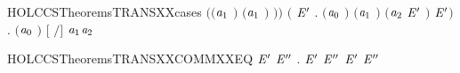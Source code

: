 \begin{SaveVerbatim}{HOLCCSTheoremsTRANSXXcases}
            \ensuremath{(}\ensuremath{(}\ensuremath{\HOLBoundVar{a}\sb{\mathrm{1}}} \HOLSymConst{\ensuremath{=}} \HOLConst{\ensuremath{\tau}}\ensuremath{)} \HOLSymConst{\HOLTokenDisj{}} \ensuremath{(}\ensuremath{\HOLBoundVar{a}\sb{\mathrm{1}}} \HOLSymConst{\ensuremath{=}}  \ensuremath{)} \HOLSymConst{\HOLTokenConj{}}  \HOLConst{\HOLTokenNotIn{}}  \HOLSymConst{\HOLTokenConj{}}   \HOLConst{\HOLTokenNotIn{}} \ensuremath{)}\ensuremath{)} \HOLSymConst{\HOLTokenDisj{}}
       \ensuremath{(}\HOLSymConst{\HOLTokenExists{}}  \ensuremath{\HOLBoundVar{E}\sp{\prime}} .
            \ensuremath{(}\ensuremath{\HOLBoundVar{a}\sb{\mathrm{0}}} \HOLSymConst{\ensuremath{=}}   \ensuremath{)} \HOLSymConst{\HOLTokenConj{}} \ensuremath{(}\ensuremath{\HOLBoundVar{a}\sb{\mathrm{1}}} \HOLSymConst{\ensuremath{=}}   \ensuremath{)} \HOLSymConst{\HOLTokenConj{}}
            \ensuremath{(}\ensuremath{\HOLBoundVar{a}\sb{\mathrm{2}}} \HOLSymConst{\ensuremath{=}}  \ensuremath{\HOLBoundVar{E}\sp{\prime}} \ensuremath{)} \HOLSymConst{\HOLTokenConj{}}  \HOLTokenTransBegin{}\HOLTokenTransEnd \ensuremath{\HOLBoundVar{E}\sp{\prime}}\ensuremath{)} \HOLSymConst{\HOLTokenDisj{}}
       \HOLSymConst{\HOLTokenExists{}} . \ensuremath{(}\ensuremath{\HOLBoundVar{a}\sb{\mathrm{0}}} \HOLSymConst{\ensuremath{=}}   \ensuremath{)} \HOLSymConst{\HOLTokenConj{}} \ensuremath{[}  \ensuremath{/}\ensuremath{]}  \HOLTokenTransBegin\ensuremath{\HOLBoundVar{a}\sb{\mathrm{1}}}\HOLTokenTransEnd \ensuremath{\HOLBoundVar{a}\sb{\mathrm{2}}}
\end{SaveVerbatim}
\newcommand{\HOLCCSTheoremsTRANSXXcases}{\UseVerbatim{HOLCCSTheoremsTRANSXXcases}}
\begin{SaveVerbatim}{HOLCCSTheoremsTRANSXXCOMMXXEQ}
\HOLTokenTurnstile{} \HOLSymConst{\HOLTokenForall{}} \ensuremath{\HOLBoundVar{E}\sp{\prime}} \ensuremath{\HOLBoundVar{E}\sp{\prime\prime}} .  \HOLSymConst{\ensuremath{+}} \ensuremath{\HOLBoundVar{E}\sp{\prime}} \HOLTokenTransBegin{}\HOLTokenTransEnd \ensuremath{\HOLBoundVar{E}\sp{\prime\prime}} \HOLSymConst{\HOLTokenEquiv{}} \ensuremath{\HOLBoundVar{E}\sp{\prime}} \HOLSymConst{\ensuremath{+}}  \HOLTokenTransBegin{}\HOLTokenTransEnd \ensuremath{\HOLBoundVar{E}\sp{\prime\prime}}
\end{SaveVerbatim}
